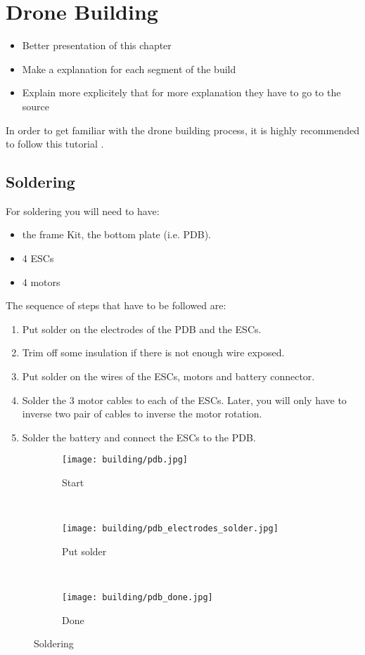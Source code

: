 \chapter{Drone Building}
{\color{red}
\begin{itemize}
    \item Better presentation of this chapter
    \item Make a explanation for each segment of the build
    \item Explain more explicitely that for more explanation they have to go to the source
\end{itemize}
}

In order to get familiar with the drone building process, it is highly recommended to follow this tutorial \cite{udemy_build_course}.

\section{Soldering}
For soldering you will need to have:
\begin{itemize}
    \item the frame Kit, the bottom plate (i.e. PDB).
    \item 4 ESCs
    \item 4 motors
\end{itemize}
The sequence of steps that have to be followed are:
\begin{enumerate}
    \item Put solder on the electrodes of the PDB and the ESCs.
    \item Trim off some insulation if there is not enough wire exposed.
    \item Put solder on the wires of the ESCs, motors and battery connector.
    \item Solder the 3 motor cables to each of the ESCs. Later, you will only have to inverse two pair of cables to inverse the motor rotation.
    \item Solder the battery and connect the ESCs to the PDB.
\end{enumerate}
\begin{figure}[!ht]
    \centering
    \begin{subfigure}[b]{0.3\textwidth}
        \texttt{[image: building/pdb.jpg]}
        \caption{Start}
        \label{fig:pdb}
    \end{subfigure}
    ~
    \begin{subfigure}[b]{0.3\textwidth}
        \texttt{[image: building/pdb\_electrodes\_solder.jpg]}
        \caption{Put solder}
        \label{fig:pdb_electrodes_solder}
    \end{subfigure}
    ~
    \begin{subfigure}[b]{0.3\textwidth}
        \texttt{[image: building/pdb\_done.jpg]}
        \caption{Done}
        \label{fig:pdb_done}
    \end{subfigure}
    \caption{Soldering}\label{fig:soldering}
\end{figure}



